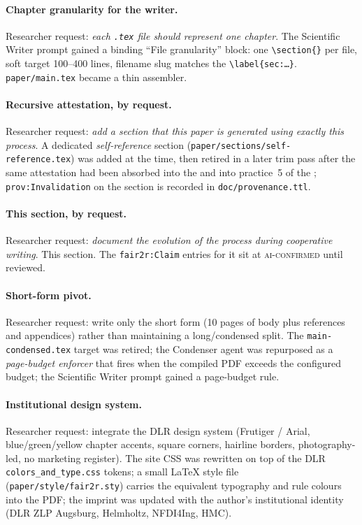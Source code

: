 \paragraph{Chapter granularity for the writer.}
Researcher request: \emph{each \texttt{.tex} file should represent
one chapter}. The Scientific Writer prompt gained a binding
``File granularity'' block: one \texttt{\textbackslash section\{\}}
per file, soft target 100--400 lines, filename slug matches the
\texttt{\textbackslash label\{sec:\dots\}}. \texttt{paper/main.tex}
became a thin assembler.

\paragraph{Recursive attestation, by request.}
Researcher request: \emph{add a section that this paper is generated
using exactly this process}. A dedicated \emph{self-reference}
section (\texttt{paper/sections/self-reference.tex}) was added at
the time, then retired in a later trim pass after the same
attestation had been absorbed into the
 and into practice~5 of
the ; \texttt{prov:Invalidation} on the section is
recorded in \texttt{doc/provenance.ttl}.

\paragraph{This section, by request.}
Researcher request: \emph{document the evolution of the process
during cooperative writing}. This section. The \texttt{fair2r:Claim}
entries for it sit at \textsc{ai-confirmed} until reviewed.

\paragraph{Short-form pivot.}
Researcher request: write only the short form (10 pages of body plus
references and appendices) rather than maintaining a long/condensed
split. The \texttt{main-condensed.tex} target was retired; the
Condenser agent was repurposed as a \emph{page-budget enforcer} that
fires when the compiled PDF exceeds the configured budget; the
Scientific Writer prompt gained a page-budget rule.

\paragraph{Institutional design system.}
Researcher request: integrate the DLR design system (Frutiger /
Arial, blue/green/yellow chapter accents, square corners, hairline
borders, photography-led, no marketing register). The site CSS was
rewritten on top of the DLR \texttt{colors\_and\_type.css} tokens; a
small \LaTeX{} style file (\texttt{paper/style/fair2r.sty}) carries
the equivalent typography and rule colours into the PDF; the
imprint was updated with the author's institutional identity (DLR
ZLP Augsburg, Helmholtz, NFDI4Ing, HMC).


